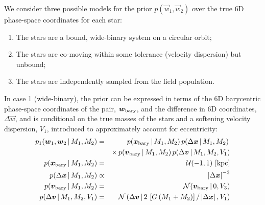 \documentclass[12pt,letterpaper]{article}
\begin{document}
We consider three possible models for the prior $p(\vec{w}_1, \vec{w}_2)$ over
the true 6D phase-space coordinates for each star:
\begin{enumerate}
    \item The stars are a bound, wide-binary system on a circular orbit;
    \item The stars are co-moving within some tolerance (velocity dispersion)
    but unbound;
    \item The stars are independently sampled from the field population.
\end{enumerate}
In case 1 (wide-binary), the prior can be expressed in terms of the 6D
barycentric phase-space coordinates of the pair, $\vec{w}_{\rm bary}$, and the
difference in 6D coordinates, $\Delta\vec{w}$, and is conditional on the true
masses of the stars and a softening velocity dispersion, $V_1$, introduced to
approximately account for eccentricity:
\begin{eqnarray}
    p_1(\vec{w}_1, \vec{w}_2 \given M_1, M_2) &=&
        p(\vec{x}_{\rm bary} \given M_1, M_2) \,
        p(\Delta\vec{x} \given M_1, M_2) \, \\
    && \times \,
        p(\vec{v}_{\rm bary} \given M_1, M_2) \,
        p(\Delta\vec{v} \given M_1, M_2, V_1) \\
    p(\vec{x}_{\rm bary} \given M_1, M_2) &=& \mathcal{U}(-1,1)~[{\rm kpc}] \\
    p(\Delta\vec{x} \given M_1, M_2) &\propto& \left|\Delta\vec{x}\right|^{-3} \\
    p(\vec{v}_{\rm bary} \given M_1, M_2) &=&
      \mathcal{N}(\vec{v}_{\rm bary} \given 0, V_3) \\
    p(\Delta\vec{v} \given M_1, M_2, V_1) &=&
      \mathcal{N}\left(\Delta\vec{v} \given
        2\,\left[G \, (M_1+M_2)\right]/\left|\Delta\vec{x}\right|, V_1\right) \\
\end{eqnarray}


%
\end{document}
